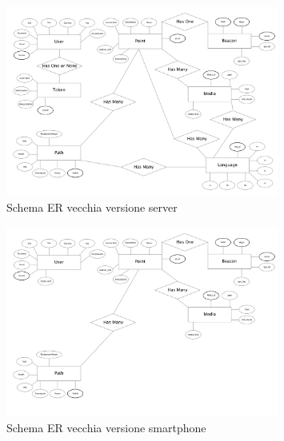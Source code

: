 \begin{figure}[h]
\centering
\includegraphics[width=0.8\textwidth]{images/erOld.png}
\caption{Schema ER vecchia versione server}
\end{figure}

\begin{figure}[h]
\centering
\includegraphics[width=0.8\textwidth]{images/erOldSpartphone.png}
\caption{Schema ER vecchia versione smartphone}
\end{figure}
\vspace{5mm}






